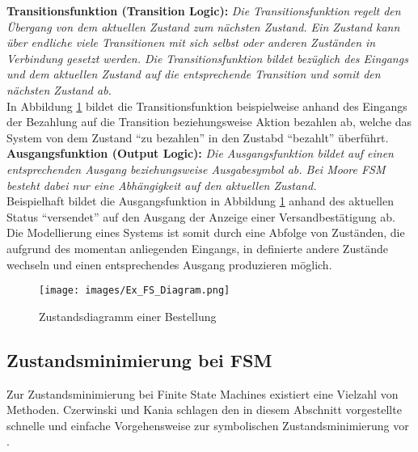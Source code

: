 \textbf{Transitionsfunktion (Transition Logic):} \textit{Die Transitionsfunktion regelt den Übergang von dem aktuellen Zustand zum nächsten Zustand. Ein Zustand kann über endliche viele Transitionen mit sich selbst oder anderen Zuständen in Verbindung gesetzt werden. Die Transitionsfunktion bildet bezüglich des Eingangs und dem aktuellen Zustand auf die entsprechende Transition und somit den nächsten Zustand ab.}\\
In Abbildung \ref{img:Ex_FS_Diagram} bildet die Transitionsfunktion beispielweise anhand des Eingangs der Bezahlung auf die Transition beziehungsweise Aktion bezahlen ab, welche das System von dem Zustand "`zu bezahlen"' in den Zustabd "`bezahlt"' überführt.\\

\textbf{Ausgangsfunktion (Output Logic):} \textit{Die Ausgangsfunktion bildet auf einen entsprechenden Ausgang beziehungsweise Ausgabesymbol ab. Bei Moore FSM besteht dabei nur eine Abhängigkeit auf den aktuellen Zustand.}\\
Beispielhaft bildet die Ausgangsfunktion in Abbildung \ref{img:Ex_FS_Diagram} anhand des aktuellen Status "`versendet"' auf den Ausgang der Anzeige einer Versandbestätigung ab.\\

Die Modellierung eines Systems ist somit durch eine Abfolge von Zuständen, die aufgrund des momentan anliegenden Eingangs, in definierte andere Zustände wechseln und einen entsprechendes Ausgang produzieren möglich.

\begin{figure}
	\centering
	\texttt{[image: images/Ex\_FS\_Diagram.png]}
	\caption{Zustandsdiagramm einer Bestellung \cite{RBF16}}
	\label{img:Ex_FS_Diagram}
\end{figure}

\subsection{Zustandsminimierung bei FSM}
\label{subsec:StateMinimization}
Zur Zustandsminimierung bei Finite State Machines existiert eine Vielzahl von Methoden. Czerwinski und Kania schlagen den in diesem Abschnitt vorgestellte schnelle und einfache Vorgehensweise zur symbolischen Zustandsminimierung vor \cite{CK13}.

